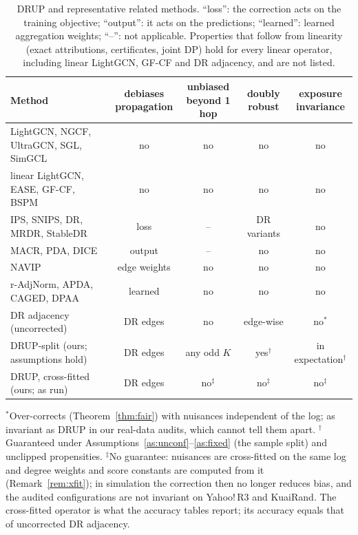 \begin{table}[t]\centering\footnotesize
\caption{DRUP and representative related methods. ``loss'': the correction
acts on the training objective; ``output'': it acts on the predictions;
``learned'': learned aggregation weights; ``--'': not applicable. Properties
that follow from linearity (exact attributions, certificates, joint DP) hold
for every linear operator, including linear LightGCN, GF-CF and DR adjacency,
and are not listed.}\label{tab:related}
\setlength{\tabcolsep}{4pt}
\begin{adjustbox}{max width=\textwidth}
\begin{tabular}{lcccc}
\toprule
Method & \shortstack{debiases\\propagation} & \shortstack{unbiased\\beyond 1 hop} & \shortstack{doubly\\robust} &
\shortstack{exposure\\invariance}\\
\midrule
\shortstack[l]{LightGCN, NGCF,\\UltraGCN, SGL, SimGCL} & no & no & no & no\\[2pt]
\shortstack[l]{linear LightGCN,\\EASE, GF-CF, BSPM} & no & no & no & no\\[2pt]
\shortstack[l]{IPS, SNIPS, DR,\\MRDR, StableDR} & loss & -- & DR variants & no\\[2pt]
MACR, PDA, DICE & output & -- & no & no\\
NAVIP & edge weights & no & no & no\\
\shortstack[l]{r-AdjNorm, APDA,\\CAGED, DPAA} & learned & no & no & no\\[2pt]
DR adjacency (uncorrected) & DR edges & no & edge-wise & no$^\ast$\\
\midrule
DRUP-split (ours; assumptions hold) & DR edges & any odd $K$ & yes$^\dagger$ & in expectation$^\dagger$\\
DRUP, cross-fitted (ours; as run) & DR edges & no$^\ddagger$ & no$^\ddagger$ & no$^\ddagger$\\
\bottomrule
\end{tabular}
\end{adjustbox}
\par\smallskip
\raggedright\scriptsize $^\ast$Over-corrects (Theorem~\ref{thm:fair}) with nuisances independent of the log; as invariant as DRUP in our real-data audits, which cannot tell them apart.
$^\dagger$Guaranteed under Assumptions~\ref{as:unconf}--\ref{as:fixed} (the sample split) and unclipped propensities.
$^\ddagger$No guarantee: nuisances are cross-fitted on the same log and degree weights and score constants are computed from it
(Remark~\ref{rem:xfit}); in simulation the correction then no longer reduces bias, and the audited configurations are not invariant on Yahoo!\,R3 and KuaiRand.
The cross-fitted operator is what the accuracy tables report; its accuracy equals that of uncorrected DR adjacency.
\end{table}
